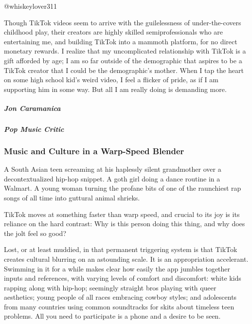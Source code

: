 \href{https://www.tiktok.com/@whiskeylover311/video/6695561872676048133?u_code=d74k67k9e5617b\&preview_pb=0\&language=en\&timestamp=1570040014\&utm_campaign=client_share\&app=musically\&utm_medium=ios\&user_id=6710526270067426310\&tt_from=more\&utm_source=more\&enter_from=h5_m}{}

@whiskeylover311

Though TikTok videos seem to arrive with the guilelessness of
under-the-covers childhood play, their creators are highly skilled
semiprofessionals who are entertaining me, and building TikTok into a
mammoth platform, for no direct monetary rewards. I realize that my
uncomplicated relationship with TikTok is a gift afforded by age; I am
so far outside of the demographic that aspires to be a TikTok creator
that I could be the demographic's mother. When I tap the heart on some
high school kid's weird video, I feel a flicker of pride, as if I am
supporting him in some way. But all I am really doing is demanding more.

\hypertarget{jon-caramanica-1}{%
\subparagraph{Jon Caramanica}\label{jon-caramanica-1}}

\hypertarget{pop-music-critic}{%
\subparagraph{Pop Music Critic}\label{pop-music-critic}}

\hypertarget{music-and-culture-in-a-warp-speed-blender}{%
\subsubsection{Music and Culture in a Warp-Speed
Blender}\label{music-and-culture-in-a-warp-speed-blender}}

A South Asian teen screaming at his haplessly silent grandmother over a
decontextualized hip-hop snippet. A goth girl doing a dance routine in a
Walmart. A young woman turning the profane bits of one of the raunchiest
rap songs of all time into guttural animal shrieks.

TikTok moves at something faster than warp speed, and crucial to its joy
is its reliance on the hard contrast: Why is this person doing this
thing, and why does the jolt feel so good?

Lost, or at least muddied, in that permanent triggering system is that
TikTok creates cultural blurring on an astounding scale. It is an
appropriation accelerant. Swimming in it for a while makes clear how
easily the app jumbles together inputs and references, with varying
levels of comfort and discomfort: white kids rapping along with hip-hop;
seemingly straight bros playing with queer aesthetics; young people of
all races embracing cowboy styles; and adolescents from many countries
using common soundtracks for skits about timeless teen problems. All you
need to participate is a phone and a desire to be seen.

